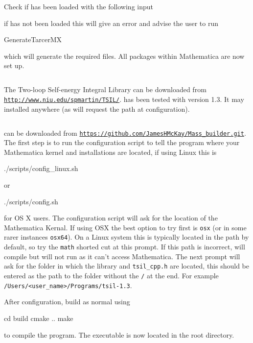 Check if \tarcer has been loaded with the following input
if \tarcer has not been loaded this will give an error and advise the user to run
\begin{lstterm}
GenerateTarcerMX
\end{lstterm}
which will generate the required files.  All packages within Mathematica are now set up.

\subsection{\tsil}
The Two-loop Self-energy Integral Library can be downloaded from \href{http://www.niu.edu/spmartin/TSIL/}{\lstinline{http://www.niu.edu/spmartin/TSIL/}}.  \mb has been tested with version 1.3. It may installed anywhere (as \mb will request the path at configuration).

\subsection{\mb}
\mb can be downloaded from \href{https://github.com/JamesHMcKay/Mass_builder.git}{\lstinline{https://github.com/JamesHMcKay/Mass_builder.git}}.  The first step is to run the configuration script to tell the program where your Mathematica kernel and \tsil installations are located, if using Linux this is
\begin{lstterm}
./scripts/config_linux.sh
\end{lstterm}
or
\begin{lstterm}
./scripts/config.sh
\end{lstterm}
for OS X users.  The configuration script will ask for the location of the Mathematica Kernal.  If using OSX the best option to try first is \lstinline{osx} (or in some rarer instances \lstinline{osx64}).  On a Linux system this is typically located in the path by default, so try the \lstinline{math} shorted cut at this prompt.  If this path is incorrect, \mb will compile but will not run as it can't access Mathematica.  The next prompt will ask for the folder in which the \tsil library and \lstinline{tsil_cpp.h} are located, this should be entered as the path to the folder without the \lstinline{/} at the end.  For example \lstinline{/Users/<user_name>/Programs/tsil-1.3}.

After configuration, build as normal using
\begin{lstterm}
cd build
cmake ..
make
\end{lstterm}
to compile the program.  The \mb executable is now located in the root directory.

